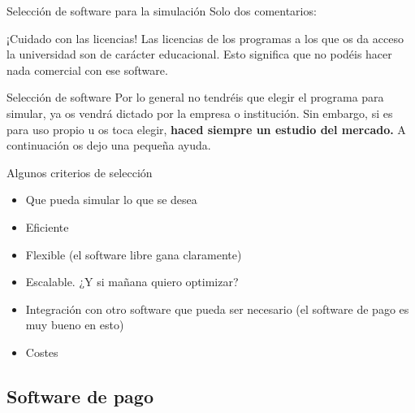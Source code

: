 \documentclass[12pt]{beamer}
\begin{document}
\begin{frame}{Selección de software para la simulación}
	Solo dos comentarios:
	\begin{block}{¡Cuidado con las licencias!}
		Las licencias de los programas a los que os da acceso la universidad son de carácter educacional. Esto significa que no podéis hacer nada comercial con ese software.
	\end{block}
	\pause
	\begin{block}{Selección de software}
		Por lo general no tendréis que elegir el programa para simular, ya os vendrá dictado por la empresa o institución. Sin embargo, si es para uso propio u os toca elegir, \textbf{haced siempre un estudio del mercado.} A continuación os dejo una pequeña ayuda.
	\end{block}
\end{frame}

\begin{frame}{Algunos criterios de selección}
	\begin{itemize}[label=$\checkmark$]
		\item Que pueda simular lo que se desea
		\item Eficiente
		\item Flexible (el software libre gana claramente)
		\item Escalable. ¿Y si mañana quiero optimizar?
		\item Integración con otro software que pueda ser necesario (el software de pago es muy bueno en esto)
		\item Costes
	\end{itemize}
\end{frame}

\subsection{Software de pago}
\end{document}
